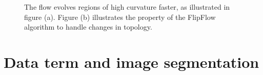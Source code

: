 {\begin{figure}
\center
{}

\caption{The flow evolves regions of high curvature faster, as illustrated in figure (a). Figure (b) illustrates the property of the FlipFlow algorithm to handle changes in topology.}
\label{fig:handle-topology-different-speed}
\end{figure}


\section{Data term and image segmentation}
\label{ch7:sec:data-term-image-segmentation}

}
